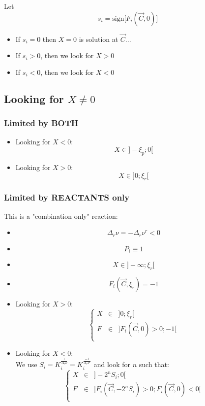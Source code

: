 \documentclass[aps,12pt]{revtex4}
\begin{document}
Let
\begin{equation}
	s_i = \mathrm{sign}\lbrack F_i(\vec{C},0) \rbrack
\end{equation}

\begin{itemize}
\item If $s_i=0$ then $X=0$ is solution at $\vec{C}$...

\item If $s_i>0$, then we look for $X>0$

\item If $s_i<0$, then we look for $X<0$

\end{itemize}

\subsection{Looking for $X\not=0$}
	
\subsubsection{Limited by BOTH}

\begin{itemize}
\item Looking for $X<0$:
$$
X \in \rbrack -\xi_p; 0 \lbrack
$$
\item Looking for $X>0$:
$$
X \in \rbrack 0; \xi_r \lbrack
$$
\end{itemize}

\subsubsection{Limited by REACTANTS only}
This is a "combination only" reaction:
\begin{itemize}
\item
$$
	\Delta_r \nu = - \Delta_r \nu^r < 0 
$$
\item $$P_i \equiv 1$$
\item $$X \in \rbrack -\infty; \xi_r \lbrack$$
\item $$F_i(\vec{C},\xi_r)=-1$$
\item Looking for $X>0$:
 $$
 \left\lbrace
 \begin{array}{rcl}
 	X &\in& \rbrack 0;\xi_r \lbrack\\
	F &\in& \rbrack F_i(\vec{C},0)>0 ; -1 \lbrack\\
\end{array}
\right.
 $$
 \item Looking for $X<0$:\\
 We use $S_i=K_i^{\frac{1}{\Delta_r \nu}}=K_i^{\frac{-1}{\Delta_r \nu^r}}$
 and look for $n$ such that:
 $$
 	\left\lbrace
 \begin{array}{rcl}
 	X &\in& \rbrack -2^n S_i;0 \lbrack\\
	F &\in& \rbrack F_i(\vec{C},-2^nS_i)>0 ; F_i(\vec{C},0)<0 \lbrack\\
\end{array}
\right.
 $$
\end{itemize}
 	
\end{document}
